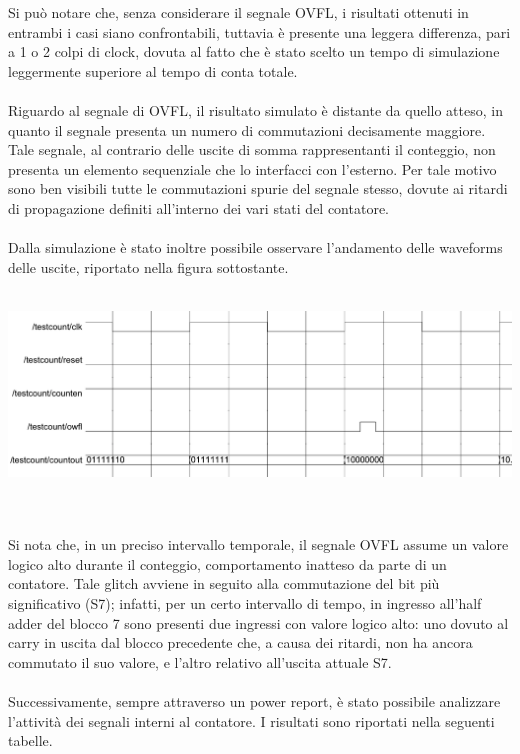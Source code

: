 \documentclass[11pt,  english, makeidx, a4paper, titlepage, oneside]{book}
\begin{document}
\vspace{0.3cm}
Si può notare che, senza considerare il segnale OVFL,
i risultati ottenuti in entrambi i casi siano
confrontabili, tuttavia è presente una leggera differenza, pari
a 1 o 2 colpi di clock, dovuta al fatto che è stato scelto un 
tempo di simulazione leggermente superiore al tempo di conta 
totale.
\\\\
Riguardo al segnale di OVFL, il risultato simulato
è distante da quello atteso, in quanto il segnale presenta un numero di commutazioni
decisamente maggiore. Tale segnale, al contrario delle uscite di somma rappresentanti il conteggio, non 
presenta un elemento sequenziale che lo interfacci con l'esterno. Per tale motivo
sono ben visibili tutte le commutazioni spurie del segnale stesso, dovute ai ritardi
di propagazione definiti all'interno dei vari stati del contatore.
\\\\
Dalla simulazione è stato inoltre possibile osservare l'andamento 
delle waveforms delle uscite, riportato nella figura sottostante.
\\\\
\centerline{\includegraphics[width=15cm]{./img/Lab_1/Es_5/Glitch.png}}
\\\\
Si nota che, in
un preciso intervallo temporale, il segnale OVFL assume un valore 
logico alto durante il conteggio, comportamento inatteso da parte
di un contatore. 
Tale glitch avviene in seguito alla commutazione
del bit più significativo (S7); infatti, per un certo intervallo di tempo,
in ingresso all'half adder del blocco 7 sono presenti due ingressi con valore
logico alto: uno dovuto al carry in uscita dal blocco precedente che, a causa
dei ritardi, non ha ancora commutato il suo valore, e l'altro relativo all'uscita
attuale S7.
\\\\
Successivamente, sempre attraverso un power report, è stato possibile
analizzare l'attività dei segnali interni al contatore. I risultati sono 
riportati nella seguenti tabelle.
\end{document}
